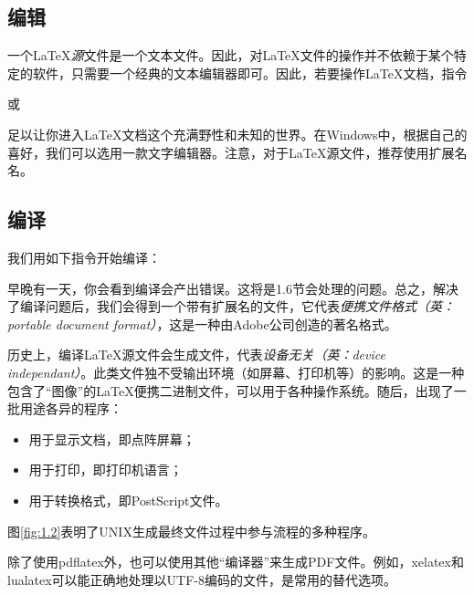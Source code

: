 \subsection{编辑}

一个\LaTeX \textit{源}文件是一个文本文件。因此，对\LaTeX 文件的操作并不依赖于某个特定的软件，只需要一个经典的文本编辑器即可。因此，若要操作\LaTeX 文档，指令


或


足以让你进入\LaTeX 文档这个充满野性和未知的世界。在Windows中，根据自己的喜好，我们可以选用一款文字编辑器。注意，对于\LaTeX 源文件，推荐使用扩展名名。

\subsection{编译}

我们用如下指令开始编译：


早晚有一天，你会看到编译会产出错误。这将是1.6节会处理的问题。总之，解决了编译问题后，我们会得到一个带有扩展名的文件，它代表\textit{便携文件格式（英：portable document format）}，这是一种由Adobe公司创造的著名格式。

\begin{ii}
    历史上，编译\LaTeX 源文件会生成文件，代表\textit{设备无关（英：device independant）}。此类文件独不受输出环境（如屏幕、打印机等）的影响。这是一种包含了“图像”的\LaTeX 便携二进制文件，可以用于各种操作系统。随后，出现了一批用途各异的程序：
    \begin{itemize}
        \item 用于显示文档，即\rightarrow 点阵屏幕；
        \item 用于打印，即\rightarrow 打印机语言；
        \item 用于转换格式，即\rightarrow PostScript文件。
    \end{itemize}
\end{ii}

图\ref{fig:1.2}表明了UNIX生成最终文件过程中参与流程的多种程序。

\begin{ii}
    除了使用pdflatex外，也可以使用其他“编译器”来生成PDF文件。例如，xelatex和lualatex可以能正确地处理以UTF-8编码的文件，是常用的替代选项。
\end{ii}

